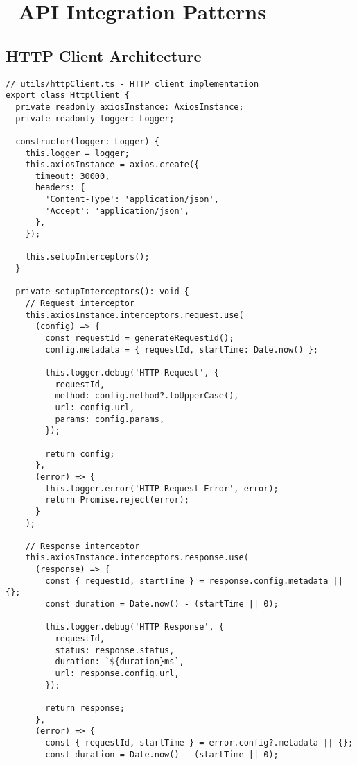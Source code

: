 \documentclass[11pt,a4paper]{article}
\begin{document}
\section{🔌 API Integration Patterns}

\subsection{HTTP Client Architecture}

\begin{lstlisting}[style=typescript, caption=HTTP Client with Interceptors]
// utils/httpClient.ts - HTTP client implementation
export class HttpClient {
  private readonly axiosInstance: AxiosInstance;
  private readonly logger: Logger;
  
  constructor(logger: Logger) {
    this.logger = logger;
    this.axiosInstance = axios.create({
      timeout: 30000,
      headers: {
        'Content-Type': 'application/json',
        'Accept': 'application/json',
      },
    });
    
    this.setupInterceptors();
  }
  
  private setupInterceptors(): void {
    // Request interceptor
    this.axiosInstance.interceptors.request.use(
      (config) => {
        const requestId = generateRequestId();
        config.metadata = { requestId, startTime: Date.now() };
        
        this.logger.debug('HTTP Request', {
          requestId,
          method: config.method?.toUpperCase(),
          url: config.url,
          params: config.params,
        });
        
        return config;
      },
      (error) => {
        this.logger.error('HTTP Request Error', error);
        return Promise.reject(error);
      }
    );
    
    // Response interceptor
    this.axiosInstance.interceptors.response.use(
      (response) => {
        const { requestId, startTime } = response.config.metadata || {};
        const duration = Date.now() - (startTime || 0);
        
        this.logger.debug('HTTP Response', {
          requestId,
          status: response.status,
          duration: `${duration}ms`,
          url: response.config.url,
        });
        
        return response;
      },
      (error) => {
        const { requestId, startTime } = error.config?.metadata || {};
        const duration = Date.now() - (startTime || 0);
        

\end{lstlisting}
\end{document}
